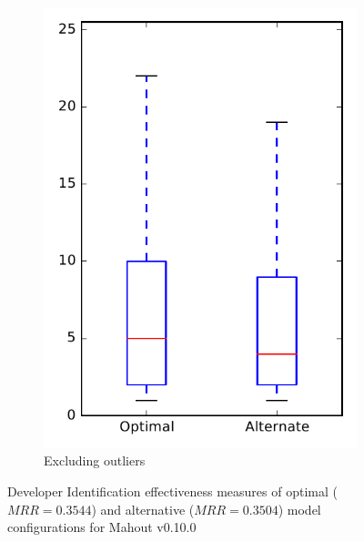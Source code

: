 \begin{figure}
\begin{subfigure}{.4\textwidth}
        \includegraphics[height=0.4\textheight]{figures/combo/dit_rq1_mahout_no_outlier}
        \caption{Excluding outliers}\label{fig:combo:dit:rq1:mahout_no_outlier}
    \end{subfigure}
\caption[Developer Identification effectiveness measures of optimal and alternative model configurations for Mahout v0.10.0]%
{Developer Identification effectiveness measures of optimal ($MRR=0.3544$) and alternative ($MRR=0.3504$) model configurations for Mahout v0.10.0}
\label{fig:combo:dit:rq1:mahout}
\end{figure}
